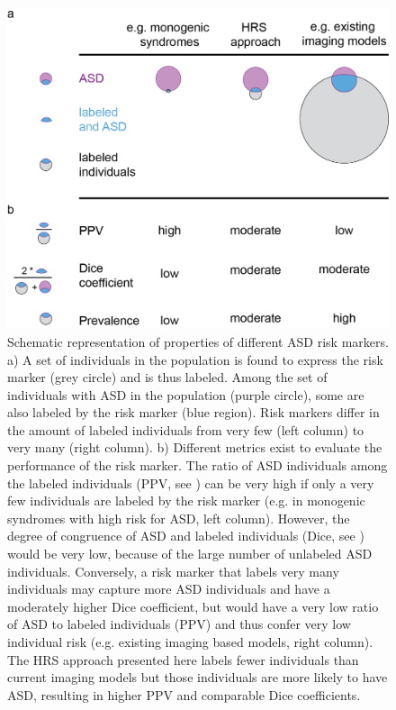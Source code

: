 \documentclass[9pt,lineno]{elife}
\begin{document}
\begin{figure}
\includegraphics[width=\linewidth]{fig5_schema}
    \caption{Schematic representation of properties of different ASD risk markers. a) A set of individuals in the population is found to express the risk marker (grey circle) and is thus labeled. Among the set of individuals with ASD in the population (purple circle), some are also labeled by the risk marker (blue region). Risk markers differ in the amount of labeled individuals from very few (left column) to very many (right column). b) Different metrics exist to evaluate the performance of the risk marker. The ratio of ASD individuals among the labeled individuals (PPV, see ) can be very high if only a very few individuals are labeled by the risk marker (e.g. in monogenic syndromes with high risk for ASD, left column). However, the degree of congruence of ASD and labeled individuals (Dice, see ) would be very low, because of the large number of unlabeled ASD individuals. Conversely, a risk marker that labels very many individuals may capture more ASD individuals and have a moderately higher Dice coefficient, but would have a very low ratio of ASD to labeled individuals (PPV) and thus confer very low individual risk (e.g. existing imaging based models, right column). The HRS approach presented here labels fewer individuals than current imaging models but those individuals are more likely to have ASD, resulting in higher PPV and comparable Dice coefficients.}
\label{fig:5_schema}
\end{figure}
\end{document}
